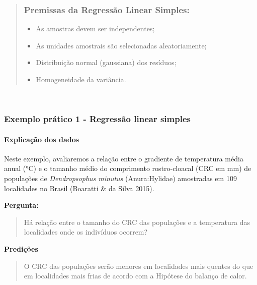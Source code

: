 \documentclass[
]{book}
\providecommand{\tightlist}{%
  \setlength{\itemsep}{0pt}\setlength{\parskip}{0pt}}
\begin{document}
\begin{quote}
\hypertarget{premissas-da-regressuxe3o-linear-simples}{%
\subsubsection{Premissas da Regressão Linear Simples:}\label{premissas-da-regressuxe3o-linear-simples}}

\begin{itemize}
\tightlist
\item
  As amostras devem ser independentes;
\item
  As unidades amostrais são selecionadas aleatoriamente;
\item
  Distribuição normal (gaussiana) dos resíduos;
\item
  Homogeneidade da variância.
\end{itemize}
\end{quote}

~

\hypertarget{exemplo-pruxe1tico-1---regressuxe3o-linear-simples}{%
\subsubsection{Exemplo prático 1 - Regressão linear simples}\label{exemplo-pruxe1tico-1---regressuxe3o-linear-simples}}

\hypertarget{explicauxe7uxe3o-dos-dados-4}{%
\paragraph{Explicação dos dados}\label{explicauxe7uxe3o-dos-dados-4}}

Neste exemplo, avaliaremos a relação entre o gradiente de temperatura média anual (°C) e o tamanho médio do comprimento rostro-cloacal (CRC em mm) de populações de \emph{Dendropsophus minutus} (Anura:Hylidae) amostradas em 109 localidades no Brasil (Boaratti \& da Silva 2015).

\textbf{Pergunta:}

\begin{quote}
Há relação entre o tamanho do CRC das populações e a temperatura das localidades onde os indivíduos ocorrem?
\end{quote}

\textbf{Predições}

\begin{quote}
O CRC das populações serão menores em localidades mais quentes do que em localidades mais frias de acordo com a Hipótese do balanço de calor.
\end{quote}
\end{document}
